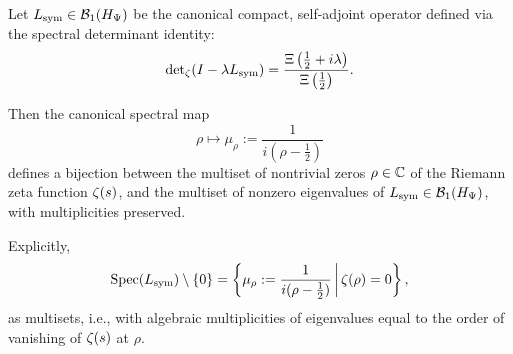 \begin{lemma}
\label{lem:spectral_bijection_consistency}
Let \( L_{\mathrm{sym}} \in \mathcal{B}_1(H_{\Psi}) \) be the canonical compact, self-adjoint operator defined via the spectral determinant identity:
\[
\det\nolimits_\zeta(I - \lambda L_{\mathrm{sym}}) = \frac{\Xi\left(\tfrac{1}{2} + i\lambda\right)}{\Xi\left(\tfrac{1}{2}\right)}.
\]

Then the canonical spectral map
\[
\rho \longmapsto \mu_\rho := \frac{1}{i(\rho - \tfrac{1}{2})}
\]
defines a bijection between the multiset of nontrivial zeros \( \rho \in \mathbb{C} \) of the Riemann zeta function \( \zeta(s) \), and the multiset of nonzero eigenvalues of \( L_{\mathrm{sym}} \in \mathcal{B}_1(H_{\Psi}) \), with multiplicities preserved.

\medskip
\noindent
Explicitly,
\[
\operatorname{Spec}(L_{\mathrm{sym}}) \setminus \{0\}
= \left\{ \mu_\rho := \frac{1}{i(\rho - \tfrac{1}{2})} \,\middle|\, \zeta(\rho) = 0 \right\},
\]
as multisets, i.e., with algebraic multiplicities of eigenvalues equal to the order of vanishing of \( \zeta(s) \) at \( \rho \).
\end{lemma}
